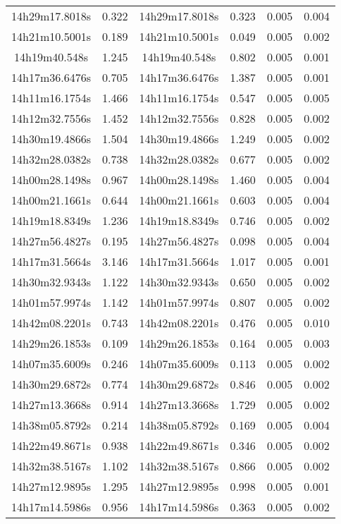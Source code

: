 \begin{table}
\begin{tabular}{cccccc}
14h29m17.8018s & 0.322 & 14h29m17.8018s & 0.323 & 0.005 & 0.004 \\
14h21m10.5001s & 0.189 & 14h21m10.5001s & 0.049 & 0.005 & 0.002 \\
14h19m40.548s & 1.245 & 14h19m40.548s & 0.802 & 0.005 & 0.001 \\
14h17m36.6476s & 0.705 & 14h17m36.6476s & 1.387 & 0.005 & 0.001 \\
14h11m16.1754s & 1.466 & 14h11m16.1754s & 0.547 & 0.005 & 0.005 \\
14h12m32.7556s & 1.452 & 14h12m32.7556s & 0.828 & 0.005 & 0.002 \\
14h30m19.4866s & 1.504 & 14h30m19.4866s & 1.249 & 0.005 & 0.002 \\
14h32m28.0382s & 0.738 & 14h32m28.0382s & 0.677 & 0.005 & 0.002 \\
14h00m28.1498s & 0.967 & 14h00m28.1498s & 1.460 & 0.005 & 0.004 \\
14h00m21.1661s & 0.644 & 14h00m21.1661s & 0.603 & 0.005 & 0.004 \\
14h19m18.8349s & 1.236 & 14h19m18.8349s & 0.746 & 0.005 & 0.002 \\
14h27m56.4827s & 0.195 & 14h27m56.4827s & 0.098 & 0.005 & 0.004 \\
14h17m31.5664s & 3.146 & 14h17m31.5664s & 1.017 & 0.005 & 0.001 \\
14h30m32.9343s & 1.122 & 14h30m32.9343s & 0.650 & 0.005 & 0.002 \\
14h01m57.9974s & 1.142 & 14h01m57.9974s & 0.807 & 0.005 & 0.002 \\
14h42m08.2201s & 0.743 & 14h42m08.2201s & 0.476 & 0.005 & 0.010 \\
14h29m26.1853s & 0.109 & 14h29m26.1853s & 0.164 & 0.005 & 0.003 \\
14h07m35.6009s & 0.246 & 14h07m35.6009s & 0.113 & 0.005 & 0.002 \\
14h30m29.6872s & 0.774 & 14h30m29.6872s & 0.846 & 0.005 & 0.002 \\
14h27m13.3668s & 0.914 & 14h27m13.3668s & 1.729 & 0.005 & 0.002 \\
14h38m05.8792s & 0.214 & 14h38m05.8792s & 0.169 & 0.005 & 0.004 \\
14h22m49.8671s & 0.938 & 14h22m49.8671s & 0.346 & 0.005 & 0.002 \\
14h32m38.5167s & 1.102 & 14h32m38.5167s & 0.866 & 0.005 & 0.002 \\
14h27m12.9895s & 1.295 & 14h27m12.9895s & 0.998 & 0.005 & 0.001 \\
14h17m14.5986s & 0.956 & 14h17m14.5986s & 0.363 & 0.005 & 0.002 \\

\end{tabular}
\end{table}
